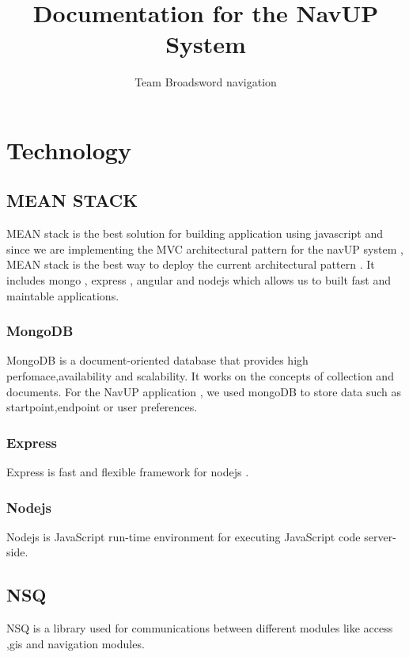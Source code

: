 \documentclass[11pt]{article}
\author{Team Broadsword navigation}
\title{Documentation for the NavUP System}
\begin{document}
	\setlength{\parskip}{6pt}
	

	
	\tableofcontents
	
	\newpage

\section{Technology}
\subsection{MEAN STACK}  
	MEAN stack is the best solution for building application using javascript and since we are implementing the MVC architectural pattern for the navUP system , MEAN stack is the best way to deploy the current architectural pattern . It includes mongo , express , angular and nodejs which allows us to built fast and maintable applications.
\subsubsection{MongoDB}	
MongoDB is a document-oriented database that provides high perfomace,availability and scalability. It works on the concepts of collection and documents. For the NavUP application , we used mongoDB to store data such as startpoint,endpoint or user preferences.
\subsubsection{Express}
Express is fast and flexible framework for nodejs . 
\subsubsection{Nodejs}	
 Nodejs is JavaScript run-time environment for executing JavaScript code server-side. 
 \subsection{NSQ} 
NSQ is a library used for communications between different modules like access ,gis and navigation modules. 
\end{document}
